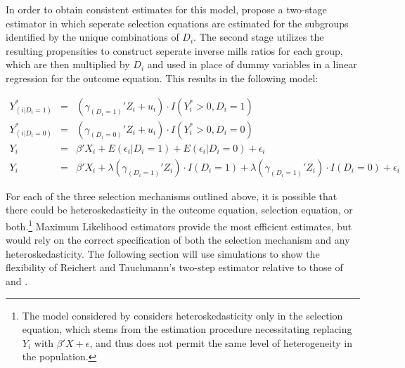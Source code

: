 \documentclass{article}
\begin{document}
In order to obtain consistent estimates for this model, \citet{reichert2014} propose a two-stage estimator in which seperate selection equations are estimated for the subgroups identified by the unique combinations of $D_i$.  The second stage utilizes the resulting propensities to construct seperate inverse mills ratios for each group, which are then multiplied by $D_i$ and used in place of dummy variables in a linear regression for the outcome equation.  This results in the following model:

\begin{eqnarray*}
Y^*_{(i|D_i=1)}&=&(\gamma_{(D_i=1)}'Z_i + u_i)\cdot I(Y^*_i>0, D_i=1) \\
Y^*_{(i|D_i=0)}&=&(\gamma_{(D_i=0)}'Z_i + u_i)\cdot I(Y^*_i>0, D_i=0) \\
  Y_i&=&\beta'X_i + E(\epsilon_i|D_i=1) + E(\epsilon_i|D_i=0) + \epsilon_i \\
  Y_i&=&\beta'X_i + \lambda(\gamma_{(D_i=1)}'Z_i)\cdot I(D_i=1) + \lambda(\gamma_{(D_i=1)}'Z_i)\cdot I(D_i=0) + \epsilon_i
\end{eqnarray*}

For each of the three selection mechanisms outlined above, it is possible that there could be heteroskedasticity in the outcome equation, selection equation, or both.\footnote{The model considered by \citet{reichert2014} considers heteroskedasticity only in the selection equation, which stems from the estimation procedure necessitating replacing $Y_i$ with $\beta'X + \epsilon$, and thus does not permit the same level of heterogeneity in the population.}  Maximum Likelihood estimators provide the most efficient estimates, but would rely on the correct specification of both the selection mechanism and any heteroskedasticity.  The following section will use simulations to show the flexibility of Reichert and Tauchmann's two-step estimator relative to those of \citet{heckman1979} and \citet{schaffner2002}. 
 
\end{document}
